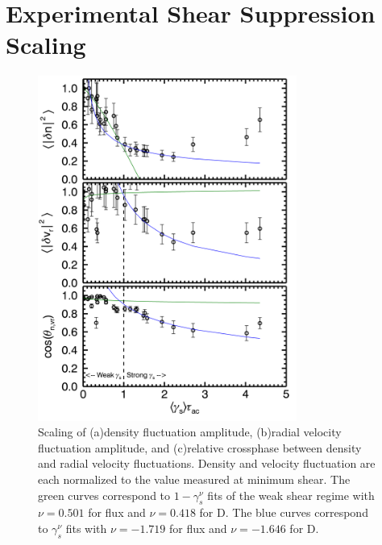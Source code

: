 \documentclass[aip,pop,amsmath,amssymb,preprint,superscriptaddress]{revtex4-1} %
\begin{document}
\section{Experimental Shear Suppression Scaling}

\begin{figure}[!htbp]
\centerline{
\includegraphics[width=8.5cm]{densvrcp}}
\caption{\label{fig:densvrcp} Scaling of (a)density fluctuation amplitude, (b)radial velocity fluctuation amplitude, and (c)relative crossphase between density and radial velocity fluctuations. Density and velocity fluctuation are each normalized to the value measured at minimum shear. The green curves correspond to $1-\gamma_{s}^{\nu}$ fits of the weak shear regime with $\nu = 0.501$ for flux and $\nu = 0.418$ for D. The blue curves correspond to $\gamma_{s}^{\nu}$ fits with $\nu = -1.719$ for flux and $\nu = -1.646$ for D.}
\end{figure}
\end{document}
